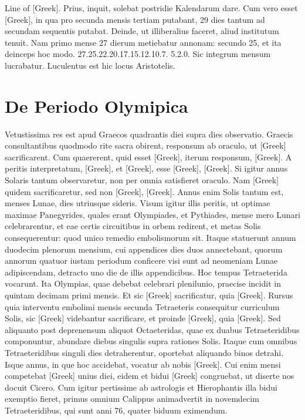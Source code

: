 \textgreek{Line of [Greek]}.
Prius, inquit, solebat postridie Kalendarum dare.
Cum vero esset
\textgreek{[Greek]}, in qua pro secunda mensis tertiam putabant,
 29 dies tantum
ad secundam sequentis putabat.
Deinde, ut illiberalius faceret, aliud
institutum tenuit.
Nam primo mense 27 dierum metiebatur annonam:
secundo 25, et ita deinceps hoc modo. 27.25.22.20.17.15.12.10.7.
5.2.0.
Sic integrum mensum lucrabatur.
Luculentus est hic locus
Aristotelis.

\section{De Periodo Olymipica}
Vetustissima res est apud Graecos quadrantis diei supra
 dies observatio.
Graecis consultantibus quodmodo
rite sacra obirent, responsum ab oraculo, ut \textgreek{[Greek]} sacrificarent.
Cum quaererent, quid esset \textgreek{[Greek]}, iterum responsum,
\textgreek{[Greek]}.
A peritis interpretatum, \textgreek{[Greek]}, et \textgreek{[Greek]},
esse \textgreek{[Greek]}, \textgreek{[Greek]}.
Si igitur annus Solaris tantum
observaretur, non per omnia satisfieret oraculo.
Nam \textgreek{[Greek]}
quidem sacrificaretur, sed non \textgreek{[Greek]}, \textgreek{[Greek]}.
Annus enim
Solis tantum est, menses Lunae, dies utriusque sideris.
Visum igitur
illis peritis, ut optimae maximae Panegyrides, quales erant Olympiades,
et Pythiades, mense mero Lunari celebrarentur, et eae certis circuitibus
in orbem redirent, et metas Solis consequerentur: quod unico
remedio embolismorum sit.
Itaque statuerunt annum duodecim plenorum
mensium, cui appendices dies duos annectebant, quorum annorum
quatuor iustam periodum conficere visi sunt ad neomeniam
Lunae adipiscendam, detracto uno die de illis appendicibus.
Hoc tempus
Tetraeterida vocarunt.
Ita Olympias, quae debebat celebrari plenilunio,
praecise incidit in quintam decimam primi mensis.
Et sic \textgreek{[Greek]}
sacrificatur, quia \textgreek{[Greek]}.
Rursus quia interventu embolimi mensis
secunda Tetraeteris consequitur curriculum Solis,
 sic \textgreek{[Greek]} videbantur
sacrificare, et proinde \textgreek{[Greek]}, quia \textgreek{[Greek]}.
Sed aliquanto post deprenensum aliquot Octaeteridas, quae ex
duabus Tetraeteridibus componuntur, abundare diebus singulis supra
rationes Solis.
Itaque cum omnibus Tetraeteridibus singuli dies detraherentur,
oportebat aliquando binos detrahi.
Isque annus, in que hoc
accidebat, vocatur ab nobis \textgreek{[Greek]}.
Cui enim mensi competebat
\textgreek{[Greek]} unius diei, eidem et bidui
 \textgreek{[Greek]} congruebat, ut diserte
nos docuit Cicero.
Cum igitur pertissime ab astrologis et Hierophantis
illa bidui exemptio fieret, primus omnium Calippus animadvertit
in novemdecim Tetraeteridibus, qui sunt anni 76, quater biduum eximendum.

